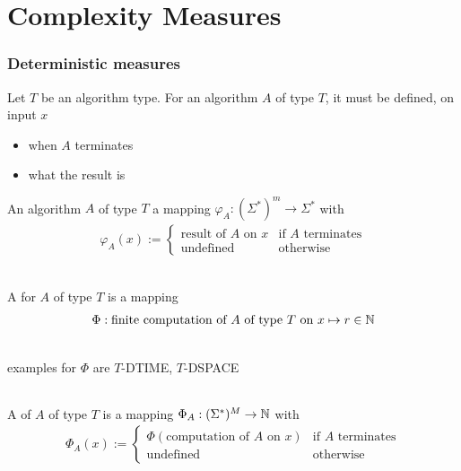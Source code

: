 \documentclass[10pt,twocolumn]{article}
\begin{document}
\part{Complexity Measures}

\section{Deterministic measures}

Let $T$ be an algorithm type. For an algorithm $A$ of type $T$, it must be
defined, on input $x$
\begin{itemize}
\item when $A$ terminates
\item what the result is
\end{itemize}

An algorithm $A$ of type $T$  a mapping $\varphi_A: (\Sigma^*)^m
\rightarrow \Sigma^*$ with
\begin{align*}
  \varphi_A(x) :=
  \begin{cases}
    \text{result of $A$ on $x$} & \text{if $A$ terminates} \\
    \text{undefined} & \text{otherwise}
  \end{cases}
\end{align*} 

\paragraph{} A  for $A$ of type $T$ is a mapping
\begin{align*}
  \Phi : \text{finite computation of $A$ of type $T$ on $x$} \mapsto r \in \mathbb{N}
\end{align*}


\paragraph{} examples for $\Phi$ are $T$-\textsc{DTIME}, $T$-\textsc{DSPACE}

\paragraph{} A  of $A$ of type $T$ is a
mapping $\Phi_A: (\Sigma^*)^M \rightarrow \mathbb{N}$ with
\begin{align*}
  \Phi_A(x) :=
  \begin{cases}
    \Phi(\text{computation of $A$ on $x$})& \text{if $A$ terminates} \\
    \text{undefined} & \text{otherwise}
  \end{cases}
\end{align*} 
\end{document}
